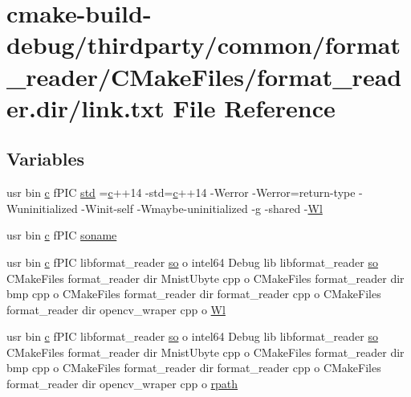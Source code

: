 \hypertarget{thirdparty_2common_2format__reader_2CMakeFiles_2format__reader_8dir_2link_8txt}{}\section{cmake-\/build-\/debug/thirdparty/common/format\+\_\+reader/\+C\+Make\+Files/format\+\_\+reader.dir/link.txt File Reference}
\label{thirdparty_2common_2format__reader_2CMakeFiles_2format__reader_8dir_2link_8txt}
\subsection*{Variables}
\begin{DoxyCompactItemize}
\item 
usr bin \hyperlink{CMakeCache_8txt_aac1d6a1710812201527c735f7c6afbaa}{c} f\+P\+IC \hyperlink{thirdparty_2common_2format__reader_2CMakeFiles_2format__reader_8dir_2link_8txt_a5f87c8f8e33670f7c8c5221b6be1bcc4}{std} =\hyperlink{CMakeCache_8txt_aac1d6a1710812201527c735f7c6afbaa}{c}++14 -\/std=\hyperlink{CMakeCache_8txt_aac1d6a1710812201527c735f7c6afbaa}{c}++14 -\/Werror -\/Werror=return-\/type -\/Wuninitialized -\/Winit-\/self -\/Wmaybe-\/uninitialized -\/g -\/shared -\/\hyperlink{thirdparty_2extension_2CMakeFiles_2cpu__extension_8dir_2link_8txt_af9ccbf658ed2deb89d0d79f211e5b033}{Wl}
\item 
usr bin \hyperlink{CMakeCache_8txt_aac1d6a1710812201527c735f7c6afbaa}{c} f\+P\+IC \hyperlink{thirdparty_2common_2format__reader_2CMakeFiles_2format__reader_8dir_2link_8txt_ab65a9b6457c4853ed17f89f945516e66}{soname}
\item 
usr bin \hyperlink{CMakeCache_8txt_aac1d6a1710812201527c735f7c6afbaa}{c} f\+P\+IC libformat\+\_\+reader \hyperlink{CMakeCache_8txt_aa98797039f48d335ee715de4cd92852f}{so} o intel64 Debug lib libformat\+\_\+reader \hyperlink{CMakeCache_8txt_aa98797039f48d335ee715de4cd92852f}{so} C\+Make\+Files format\+\_\+reader dir Mnist\+Ubyte cpp o C\+Make\+Files format\+\_\+reader dir bmp cpp o C\+Make\+Files format\+\_\+reader dir format\+\_\+reader cpp o C\+Make\+Files format\+\_\+reader dir opencv\+\_\+wraper cpp o \hyperlink{thirdparty_2common_2format__reader_2CMakeFiles_2format__reader_8dir_2link_8txt_a9ad53fca0052428aab5ca4eb56074e08}{Wl}
\item 
usr bin \hyperlink{CMakeCache_8txt_aac1d6a1710812201527c735f7c6afbaa}{c} f\+P\+IC libformat\+\_\+reader \hyperlink{CMakeCache_8txt_aa98797039f48d335ee715de4cd92852f}{so} o intel64 Debug lib libformat\+\_\+reader \hyperlink{CMakeCache_8txt_aa98797039f48d335ee715de4cd92852f}{so} C\+Make\+Files format\+\_\+reader dir Mnist\+Ubyte cpp o C\+Make\+Files format\+\_\+reader dir bmp cpp o C\+Make\+Files format\+\_\+reader dir format\+\_\+reader cpp o C\+Make\+Files format\+\_\+reader dir opencv\+\_\+wraper cpp o \hyperlink{thirdparty_2common_2format__reader_2CMakeFiles_2format__reader_8dir_2link_8txt_a59765fadfe6614a969383e81277046b2}{rpath}
\end{DoxyCompactItemize}


